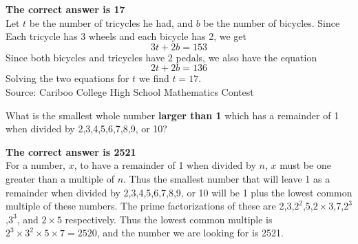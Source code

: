 \documentclass{article}
\begin{document}

\textbf{The correct answer is 17}\\[1 ex]
Let $t$ be the number of tricycles he had, and $b$ be the number of bicycles. Since Each tricycle has 3 wheels and each bicycle has 2, we get
\begin{equation*}
3t+2b=153
\end{equation*}
Since both bicycles and tricycles have 2 pedals, we also have the equation
\begin{equation*}
2t+2b=136
\end{equation*}
Solving the two equations for $t$ we find $t=17$.
\\[5 ex]

\scriptsize
Source: Cariboo College High School Mathematics Contest

\normalsize
What is the smallest whole number \textbf{larger than 1} which has a remainder of 1 when divided by 2,3,4,5,6,7,8,9, or 10?


\textbf{The correct answer is 2521}\\[1 ex]
For a number, $x$, to have a remainder of 1 when divided by $n$, $x$ must be one greater than a multiple of $n$. Thus the smallest number that will leave 1 as a remainder when divided by 2,3,4,5,6,7,8,9, or 10 will be 1 plus the lowest common multiple of these numbers. The prime factorizations of these are 2,3,$2^2$,5,$2\times3$,7,$2^3$,$3^3$, and $2\times5$ respectively. Thus the lowest common multiple is $2^3\times3^2\times5\times7=2520$, and the number we are looking for is 2521.
\\[5 ex]
\end{document}
